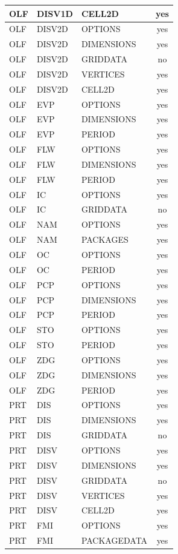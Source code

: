 \begin{longtable}{p{1.5cm} p{1.5cm} p{3cm} c}
OLF & DISV1D & CELL2D & yes \\ 
\hline
OLF & DISV2D & OPTIONS & yes \\ 
OLF & DISV2D & DIMENSIONS & yes \\ 
OLF & DISV2D & GRIDDATA & no \\ 
OLF & DISV2D & VERTICES & yes \\ 
OLF & DISV2D & CELL2D & yes \\ 
\hline
OLF & EVP & OPTIONS & yes \\ 
OLF & EVP & DIMENSIONS & yes \\ 
OLF & EVP & PERIOD & yes \\ 
\hline
OLF & FLW & OPTIONS & yes \\ 
OLF & FLW & DIMENSIONS & yes \\ 
OLF & FLW & PERIOD & yes \\ 
\hline
OLF & IC & OPTIONS & yes \\ 
OLF & IC & GRIDDATA & no \\ 
\hline
OLF & NAM & OPTIONS & yes \\ 
OLF & NAM & PACKAGES & yes \\ 
\hline
OLF & OC & OPTIONS & yes \\ 
OLF & OC & PERIOD & yes \\ 
\hline
OLF & PCP & OPTIONS & yes \\ 
OLF & PCP & DIMENSIONS & yes \\ 
OLF & PCP & PERIOD & yes \\ 
\hline
OLF & STO & OPTIONS & yes \\ 
OLF & STO & PERIOD & yes \\ 
\hline
OLF & ZDG & OPTIONS & yes \\ 
OLF & ZDG & DIMENSIONS & yes \\ 
OLF & ZDG & PERIOD & yes \\ 
\hline
PRT & DIS & OPTIONS & yes \\ 
PRT & DIS & DIMENSIONS & yes \\ 
PRT & DIS & GRIDDATA & no \\ 
\hline
PRT & DISV & OPTIONS & yes \\ 
PRT & DISV & DIMENSIONS & yes \\ 
PRT & DISV & GRIDDATA & no \\ 
PRT & DISV & VERTICES & yes \\ 
PRT & DISV & CELL2D & yes \\ 
\hline
PRT & FMI & OPTIONS & yes \\ 
PRT & FMI & PACKAGEDATA & yes \\ 

\end{longtable}
